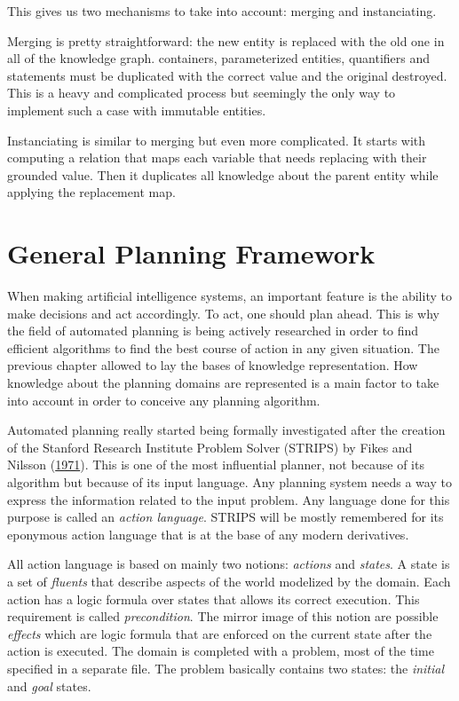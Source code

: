 \documentclass[11pt,a4paper,twoside,openright,titlepage,numbers=noenddot,headinclude,cleardoublepage=empty,openany]{scrreprt}
\theoremstyle{plain}
\theoremstyle{definition}
\theoremstyle{remark}
\begin{document}
This gives us two mechanisms to take into account: merging and
instanciating.

Merging is pretty straightforward: the new entity is replaced with the
old one in all of the knowledge graph. containers, parameterized
entities, quantifiers and statements must be duplicated with the correct
value and the original destroyed. This is a heavy and complicated
process but seemingly the only way to implement such a case with
immutable entities.

Instanciating is similar to merging but even more complicated. It starts
with computing a relation that maps each variable that needs replacing
with their grounded value. Then it duplicates all knowledge about the
parent entity while applying the replacement map.

\hypertarget{general-planning-framework}{%
\chapter{General Planning Framework}\label{general-planning-framework}}

When making artificial intelligence systems, an important feature is the
ability to make decisions and act accordingly. To act, one should plan
ahead. This is why the field of automated planning is being actively
researched in order to find efficient algorithms to find the best course
of action in any given situation. The previous chapter allowed to lay
the bases of knowledge representation. How knowledge about the planning
domains are represented is a main factor to take into account in order
to conceive any planning algorithm.

Automated planning really started being formally investigated after the
creation of the Stanford Research Institute Problem Solver (STRIPS) by
Fikes and Nilsson (\protect\hyperlink{ref-fikes_strips_1971}{1971}).
This is one of the most influential planner, not because of its
algorithm but because of its input language. Any planning system needs a
way to express the information related to the input problem. Any
language done for this purpose is called an \emph{action language}.
STRIPS will be mostly remembered for its eponymous action language that
is at the base of any modern derivatives.

All action language is based on mainly two notions: \emph{actions} and
\emph{states}. A state is a set of \emph{fluents} that describe aspects
of the world modelized by the domain. Each action has a logic formula
over states that allows its correct execution. This requirement is
called \emph{precondition}. The mirror image of this notion are possible
\emph{effects} which are logic formula that are enforced on the current
state after the action is executed. The domain is completed with a
problem, most of the time specified in a separate file. The problem
basically contains two states: the \emph{initial} and \emph{goal}
states.
\end{document}

